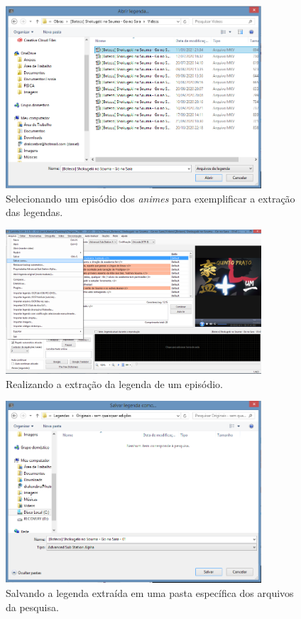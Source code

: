 \documentclass[portuguese]{textolivre}
\begin{document}
\begin{figure}[htbp]
 \centering
 \includegraphics[width=0.85\textwidth]{Fig5.png}
 \caption{Selecionando um episódio dos \textit{animes} para exemplificar a extração das legendas.}
 \label{fig05}
\end{figure}

\begin{figure}[htbp]
 \centering
 \includegraphics[width=0.85\textwidth]{Fig6.png}
 \caption{Realizando a extração da legenda de um episódio.}
 \label{fig06}
\end{figure}

\begin{figure}[htbp]
 \centering
 \includegraphics[width=0.85\textwidth]{Fig7.png}
 \caption{Salvando a legenda extraída em uma pasta específica dos arquivos da pesquisa.}
 \label{fig07}
\end{figure}
\end{document}
